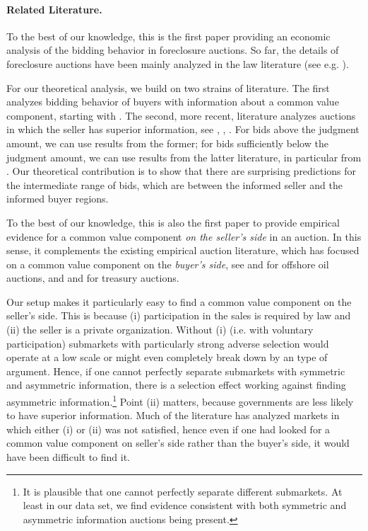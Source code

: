 \documentclass[11pt,twopage]{article}
\begin{document}
\paragraph{Related Literature.} To the best of our knowledge, this is
the first paper providing an economic analysis of the bidding behavior
in foreclosure auctions. So far, the details of foreclosure auctions
have been mainly analyzed in the law literature (see
e.g. \cite{nelson2004reforming}).

For our theoretical analysis, we build on two strains of
literature. The first analyzes bidding behavior of buyers with
information about a common value component, starting with
\cite{milgrom1982theory}. The second, more recent, literature analyzes
auctions in which the seller has superior information, see
\cite{jullien2006auction}, \cite{cai2007reserve}, \cite{lamy}. For
bids above the judgment amount, we can use results from the former;
for bids sufficiently below the judgment amount, we can use results
from the latter literature, in particular from
\cite{cai2007reserve}. Our theoretical contribution is to show that
there are surprising predictions for the intermediate range of bids,
which are between the informed seller and the informed buyer regions.

To the best of our knowledge, this is also the first paper to provide
empirical evidence for a common value component \emph{on the seller's
  side} in an auction. In this sense, it complements the existing
empirical auction literature, which has focused on a common value
component on the \emph{buyer's side}, see
\cite{hendricks1988empirical} and \cite{hendricks2003empirical} for
offshore oil auctions, and \cite{nyborg2002bidder} and
\cite{hortaccsu2012valuing} for treasury auctions.

Our setup makes it particularly easy to find a common value component
on the seller's side. This is because (i) participation in the sales
is required by law and (ii) the seller is a private
organization. Without (i) (i.e. with voluntary participation)
submarkets with particularly strong adverse selection would operate at
a low scale or might even completely break down by an
\cite{akerlof1970market} type of argument. Hence, if one cannot
perfectly separate submarkets with symmetric and asymmetric
information, there is a selection effect working against finding
asymmetric information.\footnote{It is plausible that one cannot
  perfectly separate different submarkets. At least in our data set,
  we find evidence consistent with both symmetric and asymmetric
  information auctions being present.} Point (ii) matters, because
governments are less likely to have superior information. Much of the
literature has analyzed markets in which either (i) or (ii) was not
satisfied, hence even if one had looked for a common value component on
seller's side rather than the buyer's side, it would have been difficult 
to find it.
\end{document}
